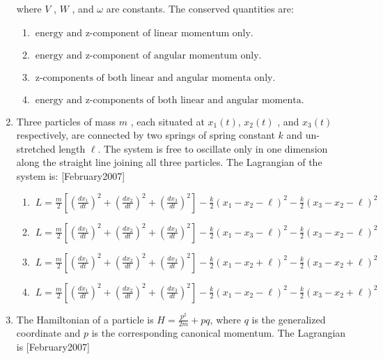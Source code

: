 \documentclass[journal]{IEEEtran}
\begin{document}
\begin{enumerate}
where  $V$ ,  $W$ , and  $\omega$  are constants. The conserved quantities are:
\begin{enumerate}
\item $\ \text{energy and z-component of linear momentum only.}$
\item $ \ \text{energy and z-component of angular momentum only.} $
\item $\ \text{z-components of both linear and angular momenta only.} $
\item $\ \text{energy and z-components of both linear and angular momenta.}$
\end{enumerate} 
\item Three particles of mass  $m$ , each situated at $ x_1(t) $,  $x_2(t)$ , and $ x_3(t)$  respectively, are connected by two springs of spring constant  $k$ and un-stretched length $ \ell $. The system is free to oscillate only in one dimension along the straight line joining all three particles. The Lagrangian of the system is: \hfill[February2007]
\begin{enumerate}
\item $ \ L = \frac{m}{2} \left[ \left( \frac{dx_1}{dt} \right)^2 + \left( \frac{dx_2}{dt} \right)^2 + \left( \frac{dx_3}{dt} \right)^2 \right] - \frac{k}{2} (x_1 - x_2 - \ell)^2 - \frac{k}{2} (x_3 - x_2 - \ell)^2$
\item $ \ L = \frac{m}{2} \left[ \left( \frac{dx_1}{dt} \right)^2 + \left( \frac{dx_2}{dt} \right)^2 + \left( \frac{dx_3}{dt} \right)^2 \right] - \frac{k}{2} (x_1 - x_3 - \ell)^2 - \frac{k}{2} (x_3 - x_2 - \ell)^2$
\item $ \ L = \frac{m}{2} \left[ \left( \frac{dx_1}{dt} \right)^2 + \left( \frac{dx_2}{dt} \right)^2 + \left( \frac{dx_3}{dt} \right)^2 \right] - \frac{k}{2} (x_1 - x_2 + \ell)^2 - \frac{k}{2} (x_3 - x_2 + \ell)^2$
\item $ \ L = \frac{m}{2} \left[ \left( \frac{dx_1}{dt} \right)^2 + \left( \frac{dx_2}{dt} \right)^2 + \left( \frac{dx_3}{dt} \right)^2 \right] - \frac{k}{2} (x_1 - x_2 - \ell)^2 - \frac{k}{2} (x_3 - x_2 + \ell)^2$
\end{enumerate}
\item The Hamiltonian of a particle is $ H = \frac{p^2}{2m} + pq $, where  $q$ is the generalized coordinate and  $p$  is the corresponding canonical momentum. The Lagrangian is \hfill[February2007]


\end{enumerate}
\end{document}
